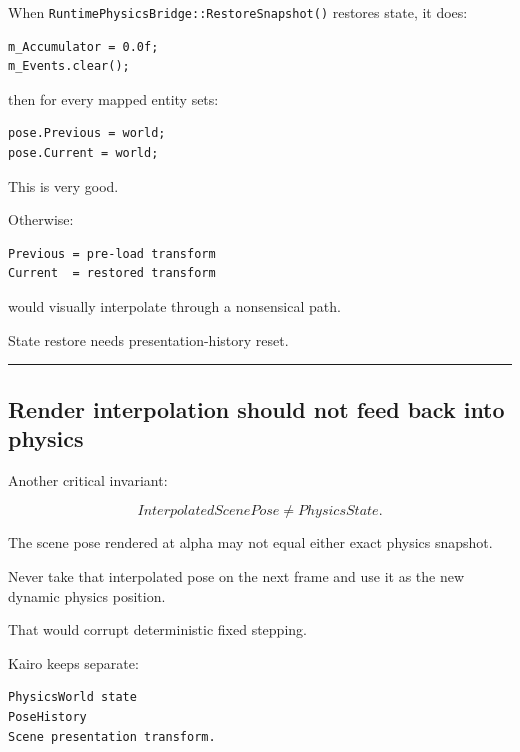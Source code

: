 \hypertarget{06-engine-ii-ch038-physics-restore-and-interpolation-history}{}

When \texttt{RuntimePhysicsBridge::RestoreSnapshot()} restores state, it does:

\begin{verbatim}
m_Accumulator = 0.0f;
m_Events.clear();
\end{verbatim}

then for every mapped entity sets:

\begin{verbatim}
pose.Previous = world;
pose.Current = world;
\end{verbatim}

This is very good.

Otherwise:

\begin{verbatim}
Previous = pre-load transform
Current  = restored transform
\end{verbatim}

would visually interpolate through a nonsensical path.

State restore needs presentation-history reset.

\begin{center}\rule{0.5\linewidth}{0.5pt}\end{center}

\subsection{Render interpolation should not feed back into physics}\label{06-engine-ii-ch038-render-interpolation-should-not-feed-back-into-physics}

\hypertarget{06-engine-ii-ch038-render-interpolation-should-not-feed-back-into-physics}{}

Another critical invariant:

\[
\boxed{
InterpolatedScenePose
\neq
PhysicsState.
}
\]

The scene pose rendered at alpha may not equal either exact physics snapshot.

Never take that interpolated pose on the next frame and use it as the new dynamic physics position.

That would corrupt deterministic fixed stepping.

Kairo keeps separate:

\begin{verbatim}
PhysicsWorld state
PoseHistory
Scene presentation transform.
\end{verbatim}

